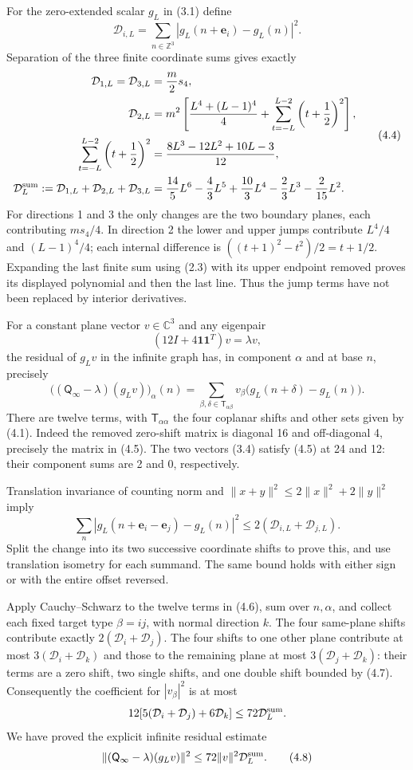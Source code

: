 \documentclass[
  11pt,
]{article}
\begin{document}
For the zero-extended scalar \(g_L\) in (3.1) define \[
\mathcal D_{i,L}=\sum_{n\in\mathbb Z^3}
 |g_L(n+\mathbf e_i)-g_L(n)|^2.
\tag{4.3}
\] Separation of the three finite coordinate sums gives exactly \[
\begin{split}
\mathcal D_{1,L}=\mathcal D_{3,L}&=\frac m2s_4,\\
\mathcal D_{2,L}
 &=m^2\left[\frac{L^4+(L-1)^4}{4}
       +\sum_{t=-L}^{L-2}\left(t+\frac12\right)^2\right],\\
\sum_{t=-L}^{L-2}\left(t+\frac12\right)^2
 &=\frac{8L^3-12L^2+10L-3}{12},\\
\mathcal D_L^{\rm sum}
 :=\mathcal D_{1,L}+\mathcal D_{2,L}+\mathcal D_{3,L}
 &=\frac{14}{5}L^6-\frac43L^5+\frac{10}{3}L^4
                         -\frac23L^3-\frac2{15}L^2.
\end{split}
\tag{4.4}
\] For directions 1 and 3 the only changes are the two boundary planes,
each contributing \(ms_4/4\). In direction 2 the lower and upper jumps
contribute \(L^4/4\) and \((L-1)^4/4\); each internal difference is
\(((t+1)^2-t^2)/2=t+1/2\). Expanding the last finite sum using (2.3)
with its upper endpoint removed proves its displayed polynomial and then
the last line. Thus the jump terms have not been replaced by interior
derivatives.

For a constant plane vector \(v\in\mathbb C^3\) and any eigenpair \[
(12I+4\mathbf1\mathbf1^T)v=\lambda v,
\tag{4.5}
\] the residual of \(g_Lv\) in the infinite graph has, in component
\(\alpha\) and at base \(n\), precisely \[
\bigl((\mathsf Q_\infty-\lambda)(g_Lv)\bigr)_\alpha(n)
 =\sum_{\beta,\delta\in\mathsf T_{\alpha\beta}}
 v_\beta\bigl(g_L(n+\delta)-g_L(n)\bigr).
\tag{4.6}
\] There are twelve terms, with \(\mathsf T_{\alpha\alpha}\) the four
coplanar shifts and other sets given by (4.1). Indeed the removed
zero-shift matrix is diagonal 16 and off-diagonal 4, precisely the
matrix in (4.5). The two vectors (3.4) satisfy (4.5) at 24 and 12: their
component sums are 2 and 0, respectively.

Translation invariance of counting norm and
\(\|x+y\|^2\le2\|x\|^2+2\|y\|^2\) imply \[
\sum_n|g_L(n+\mathbf e_i-\mathbf e_j)-g_L(n)|^2
 \le2(\mathcal D_{i,L}+\mathcal D_{j,L}).
\tag{4.7}
\] Split the change into its two successive coordinate shifts to prove
this, and use translation isometry for each summand. The same bound
holds with either sign or with the entire offset reversed.

Apply Cauchy--Schwarz to the twelve terms in (4.6), sum over
\(n,\alpha\), and collect each fixed target type \(\beta=ij\), with
normal direction \(k\). The four same-plane shifts contribute exactly
\(2(\mathcal D_i+\mathcal D_j)\). The four shifts to one other plane
contribute at most \(3(\mathcal D_i+\mathcal D_k)\) and those to the
remaining plane at most \(3(\mathcal D_j+\mathcal D_k)\): their terms
are a zero shift, two single shifts, and one double shift bounded by
(4.7). Consequently the coefficient for \(|v_\beta|^2\) is at most \[
12[5(\mathcal D_i+\mathcal D_j)+6\mathcal D_k]
 \le72\mathcal D_L^{\rm sum}.
\] We have proved the explicit infinite residual estimate \[
\| (\mathsf Q_\infty-\lambda)(g_Lv)\|^2
 \le72\|v\|^2\mathcal D_L^{\rm sum}.
\tag{4.8}
\]
\end{document}
